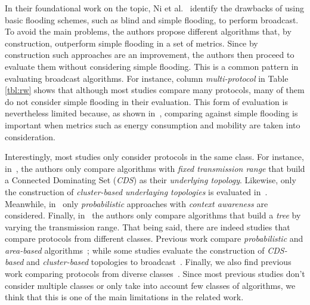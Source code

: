 In their foundational work on the topic, Ni et al.~\cite{Ni:1999:BSP:313451.313525} identify the drawbacks of using basic flooding schemes, such as blind and simple flooding, to perform broadcast.
To avoid the main problems, the authors propose different algorithms that, by construction, outperform simple flooding in a set of metrics.
Since by construction such approaches are an improvement, the authors then proceed to evaluate them without considering simple flooding.
This is a common pattern in evaluating broadcast algorithms.
For instance, column \textit{multi-protocol} in Table \ref{tbl:rw} shows that although most studies compare many protocols, many of them do not consider simple flooding in their evaluation.
This form of evaluation is nevertheless limited because, as shown in~\cite{YiGerla2003}, comparing against simple flooding is important when metrics such as energy consumption and mobility are taken into consideration.

Interestingly, most studies only consider protocols in the same class.
For instance, in~\cite{Wu2004}, the authors only compare algorithms with \textit{fixed transmission range} that build a Connected Dominating Set (\textit{CDS}) as their \textit{underlying topology}.
Likewise, only the construction of \textit{cluster-based underlaying topologies} is evaluated in~\cite{Nocetti2003}.
Meanwhile, in~\cite{Cartigny:2003:BNR:2727141.2727459} only \textit{probabilistic} approaches with \textit{context awareness} are considered.
Finally, in~\cite{Cagalj2002} the authors only compare algorithms that build a \textit{tree} by varying the transmission range.
That being said, there are indeed studies that compare protocols from different classes.
Previous work compare \textit{probabilistic} and \textit{area-based} algorithms~\cite{Ni:1999:BSP:313451.313525, Garbinato2010}; while some studies evaluate the construction of \textit{CDS-based} and \textit{cluster-based} topologies to broadcast~\cite{Stojmenovic:2002:DSN:506156.506158, WCM:WCM109}.
Finally, we also find previous work comparing protocols from diverse classes~\cite{YiGerla2003}.
Since most previous studies don't consider multiple classes or only take into account few classes of algorithms, we think that this is one of the main limitations in the related work.

